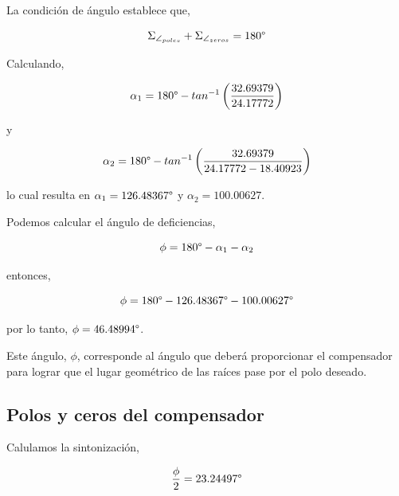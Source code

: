 \documentclass[12pt,a4paper]{article}
\begin{document}
        La condición de ángulo establece que, 

        \begin{equation}
          \Sigma_{\angle_{poles}} + \Sigma_{\angle_{zeros}} = 180\degree
          \label{eq:design:angle_condition} 
        \end{equation}

        Calculando,
        
        \begin{equation} 
          \alpha_{1} = 180\degree - tan^{-1}\left(\dfrac{32.69379}{24.17772}\right) 
        \end{equation}

        y 

        \begin{equation} 
          \alpha_{2} = 180\degree - tan^{-1}\left(\dfrac{32.69379}{24.17772 - 18.40923}\right) 
        \end{equation}

        lo cual resulta en \( \alpha_{1} = 126.48367\degree \) y \( \alpha_{2} = 100.00627 \).

        Podemos calcular el ángulo de deficiencias, 

        \begin{equation}
          \phi = 180\degree - \alpha_{1} - \alpha_{2} 
        \end{equation}

        entonces, 

        \begin{equation} 
          \phi =  180\degree - 126.48367\degree - 100.00627\degree 
        \end{equation}

        por lo tanto, \( \phi = 46.48994\degree \).

        Este ángulo, \( \phi \), corresponde al ángulo que deberá proporcionar el compensador para lograr que 
        el lugar geométrico de las raíces pase por el polo deseado. 

      \subsection{Polos y ceros del compensador}
        \label{subsec:polezero}

        Calulamos la sintonización, 

        \begin{equation} 
          \dfrac{\phi}{2} = 23.24497\degree 
        \end{equation}
\end{document}
